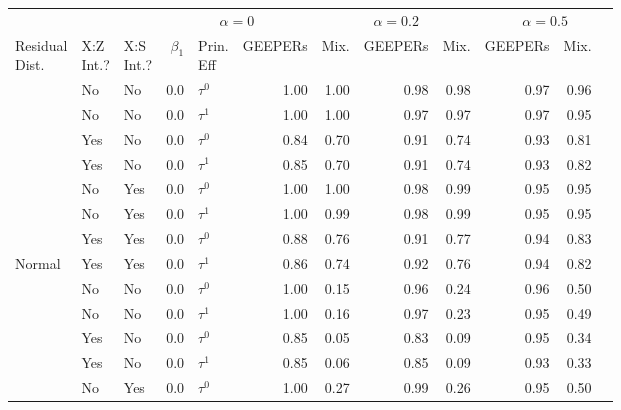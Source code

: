 
\begin{tabular}[t]{lllrlrrrrrr}
\toprule
\multicolumn{3}{c}{ } & \multicolumn{3}{c}{$\alpha=0$} & \multicolumn{3}{c}{$\alpha=0.2$} & \multicolumn{3}{c}{$\alpha=0.5$} \\
\cmidrule(l{3pt}r{3pt}){4-6} \cmidrule(l{3pt}r{3pt}){7-9} \cmidrule(l{3pt}r{3pt}){10-12}
\makecell[l]{Residual\\Dist.} & \makecell[c]{X:Z\\Int.?} & \makecell[r]{X:S\\Int.?} & $\beta_1$ & \makecell[c]{Prin.\\Eff} & GEEPERs & Mix. & GEEPERs & Mix. & GEEPERs & Mix.\\
\midrule
 & No & No & 0.0 & $\tau^0$ & 1.00 & 1.00 & 0.98 & 0.98 & 0.97 & 0.96\\

 & No & No & 0.0 & $\tau^1$ & 1.00 & 1.00 & 0.97 & 0.97 & 0.97 & 0.95\\

 & Yes & No & 0.0 & $\tau^0$ & 0.84 & 0.70 & 0.91 & 0.74 & 0.93 & 0.81\\

 & Yes & No & 0.0 & $\tau^1$ & 0.85 & 0.70 & 0.91 & 0.74 & 0.93 & 0.82\\

 & No & Yes & 0.0 & $\tau^0$ & 1.00 & 1.00 & 0.98 & 0.99 & 0.95 & 0.95\\

 & No & Yes & 0.0 & $\tau^1$ & 1.00 & 0.99 & 0.98 & 0.99 & 0.95 & 0.95\\

 & Yes & Yes & 0.0 & $\tau^0$ & 0.88 & 0.76 & 0.91 & 0.77 & 0.94 & 0.83\\

\multirow{-8}{*}{\raggedright\arraybackslash Normal} & Yes & Yes & 0.0 & $\tau^1$ & 0.86 & 0.74 & 0.92 & 0.76 & 0.94 & 0.82\\
\cmidrule{1-11}
 & No & No & 0.0 & $\tau^0$ & 1.00 & 0.15 & 0.96 & 0.24 & 0.96 & 0.50\\

 & No & No & 0.0 & $\tau^1$ & 1.00 & 0.16 & 0.97 & 0.23 & 0.95 & 0.49\\

 & Yes & No & 0.0 & $\tau^0$ & 0.85 & 0.05 & 0.83 & 0.09 & 0.95 & 0.34\\

 & Yes & No & 0.0 & $\tau^1$ & 0.85 & 0.06 & 0.85 & 0.09 & 0.93 & 0.33\\

 & No & Yes & 0.0 & $\tau^0$ & 1.00 & 0.27 & 0.99 & 0.26 & 0.95 & 0.50\\


\end{tabular}
